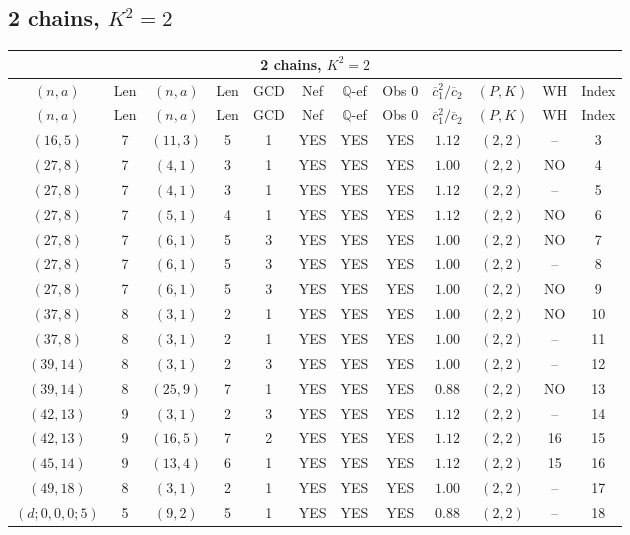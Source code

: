 \subsection{2 chains, $K^2 = 2$}
\begin{longtable}{|c|c|c|c|c|c|c|c|c|c|c|c|}
\hline
\multicolumn{12}{|c|}{2 chains, $K^2 = 2$}\\
\hline
$(n,a)$ & Len & $(n,a)$ & Len & GCD & Nef & $\mathbb Q$-ef & Obs 0 & $\overline c_1^2 / \overline c_2$ & $(P,K)$ & WH & Index\\
\hline
\endfirsthead

\hline
$(n,a)$ & Len & $(n,a)$ & Len & GCD & Nef & $\mathbb Q$-ef & Obs 0 & $\overline c_1^2 / \overline c_2$ & $(P,K)$ & WH & Index\\
\hline
\endhead
\hline
\endfoot

$(16,5)$ & 7 & $(11,3)$ & 5 & 1 & YES & YES & YES & $1.12$ & $(2,2)$ & -- & 3\\
$(27,8)$ & 7 & $(4,1)$ & 3 & 1 & YES & YES & YES & $1.00$ & $(2,2)$ & NO & 4\\
$(27,8)$ & 7 & $(4,1)$ & 3 & 1 & YES & YES & YES & $1.12$ & $(2,2)$ & -- & 5\\
$(27,8)$ & 7 & $(5,1)$ & 4 & 1 & YES & YES & YES & $1.12$ & $(2,2)$ & NO & 6\\
$(27,8)$ & 7 & $(6,1)$ & 5 & 3 & YES & YES & YES & $1.00$ & $(2,2)$ & NO & 7\\
$(27,8)$ & 7 & $(6,1)$ & 5 & 3 & YES & YES & YES & $1.00$ & $(2,2)$ & -- & 8\\
$(27,8)$ & 7 & $(6,1)$ & 5 & 3 & YES & YES & YES & $1.00$ & $(2,2)$ & NO & 9\\
$(37,8)$ & 8 & $(3,1)$ & 2 & 1 & YES & YES & YES & $1.00$ & $(2,2)$ & NO & 10\\
$(37,8)$ & 8 & $(3,1)$ & 2 & 1 & YES & YES & YES & $1.00$ & $(2,2)$ & -- & 11\\
$(39,14)$ & 8 & $(3,1)$ & 2 & 3 & YES & YES & YES & $1.00$ & $(2,2)$ & -- & 12\\
$(39,14)$ & 8 & $(25,9)$ & 7 & 1 & YES & YES & YES & $0.88$ & $(2,2)$ & NO & 13\\
$(42,13)$ & 9 & $(3,1)$ & 2 & 3 & YES & YES & YES & $1.12$ & $(2,2)$ & -- & 14\\
$(42,13)$ & 9 & $(16,5)$ & 7 & 2 & YES & YES & YES & $1.12$ & $(2,2)$ & 16 & 15\\
$(45,14)$ & 9 & $(13,4)$ & 6 & 1 & YES & YES & YES & $1.12$ & $(2,2)$ & 15 & 16\\
$(49,18)$ & 8 & $(3,1)$ & 2 & 1 & YES & YES & YES & $1.00$ & $(2,2)$ & -- & 17\\
$(d;0,0,0;5)$ & 5 & $(9,2)$ & 5 & 1 & YES & YES & YES & $0.88$ & $(2,2)$ & -- & 18
\end{longtable}
